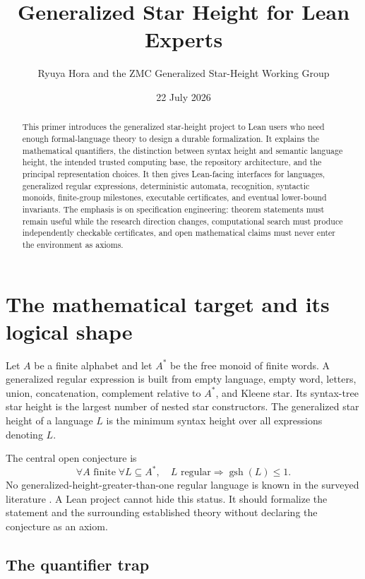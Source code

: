 \documentclass{amsart}
\title{Generalized Star Height for Lean Experts}
\author{Ryuya Hora and the ZMC Generalized Star-Height Working Group}
\date{22 July 2026}
\begin{document}
\begin{abstract}
This primer introduces the generalized star-height project to Lean users who need enough formal-language theory to design a durable formalization.  It explains the mathematical quantifiers, the distinction between syntax height and semantic language height, the intended trusted computing base, the repository architecture, and the principal representation choices.  It then gives Lean-facing interfaces for languages, generalized regular expressions, deterministic automata, recognition, syntactic monoids, finite-group milestones, executable certificates, and eventual lower-bound invariants.  The emphasis is on specification engineering: theorem statements must remain useful while the research direction changes, computational search must produce independently checkable certificates, and open mathematical claims must never enter the environment as axioms.
\end{abstract}
\maketitle
\tableofcontents

\section{The mathematical target and its logical shape}

Let $A$ be a finite alphabet and let $A^\ast$ be the free monoid of finite words.  A generalized regular expression is built from empty language, empty word, letters, union, concatenation, complement relative to $A^\ast$, and Kleene star.  Its syntax-tree star height is the largest number of nested star constructors.  The generalized star height of a language $L$ is the minimum syntax height over all expressions denoting $L$.

The central open conjecture is
\[
  \forall A\text{ finite}\;\forall L\subseteq A^\ast,
  \quad L\text{ regular}\Longrightarrow \operatorname{gsh}(L)\leq 1.
\]
No generalized-height-greater-than-one regular language is known in the surveyed literature \cite{pinStraubingTherien1992,bourne2017counting,placeZeitoun2017generic}.  A Lean project cannot hide this status.  It should formalize the statement and the surrounding established theory without declaring the conjecture as an axiom.

\subsection{The quantifier trap}
\end{document}
